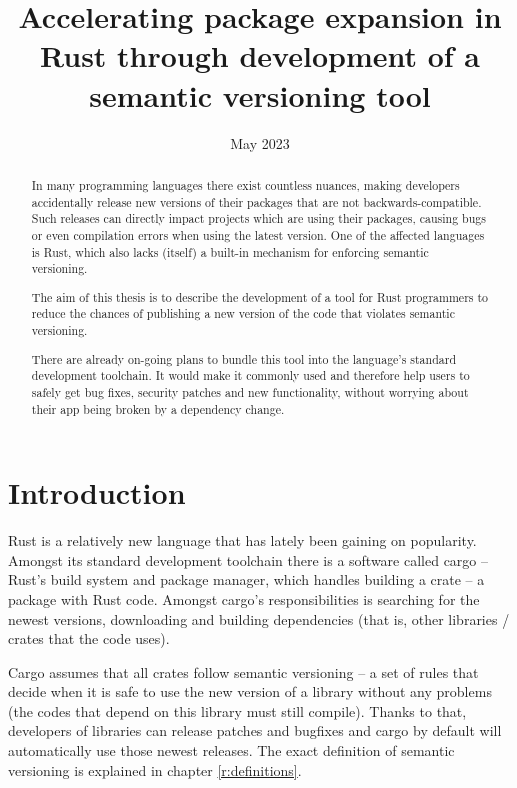 \documentclass[licencjacka,en]{pracamgr}
\title{Accelerating package expansion in Rust through development of a semantic versioning tool}
\date{May 2023}
\begin{document}
\maketitle

\begin{abstract}
In many programming languages there exist countless nuances,
making developers accidentally release new versions of their packages
that are not backwards-compatible.
Such releases can directly impact projects which are using their packages,
causing bugs or even compilation errors when using the latest version.
One of the affected languages is Rust,
which also lacks (itself) a built-in mechanism for enforcing semantic versioning.

The aim of this thesis is to describe the development of a tool
for Rust programmers to reduce the chances of publishing
a new version of the code that violates semantic versioning.

There are already on-going plans to bundle this tool
into the language's standard development toolchain.
It would make it commonly used and therefore help users to safely get bug fixes,
security patches and new functionality,
without worrying about their app being broken by a dependency change.
\end{abstract}

\tableofcontents



\chapter*{Introduction}

Rust is a relatively new language that has lately been gaining on popularity.
Amongst its standard development toolchain there is a software called cargo 
-- Rust's build system and package manager,
which handles building a crate -- a package with Rust code.
Amongst cargo's responsibilities is searching for the newest versions,
downloading and building dependencies
(that is, other libraries / crates that the code uses).

Cargo assumes that all crates follow semantic versioning
-- a set of rules that decide when it is safe to use the new version of a library
without any problems (the codes that depend on this library must still compile).
Thanks to that, developers of libraries can release patches and bugfixes
and cargo by default will automatically use those newest releases.
The exact definition of semantic versioning is explained in chapter \ref{r:definitions}.
\end{document}
